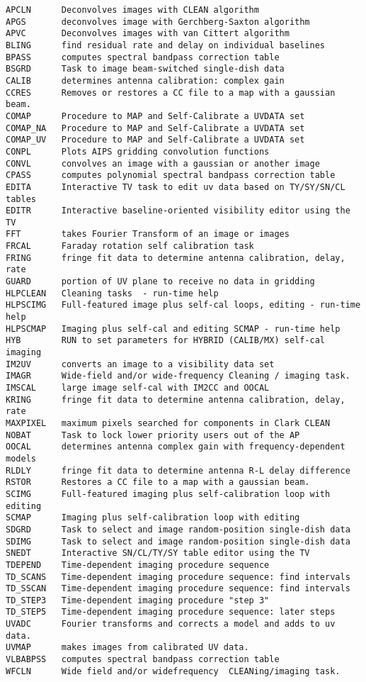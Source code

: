 \vskip 0.5pt
\bbve\begin{verbatim}
APCLN      Deconvolves images with CLEAN algorithm
APGS       deconvolves image with Gerchberg-Saxton algorithm
APVC       Deconvolves images with van Cittert algorithm
BLING      find residual rate and delay on individual baselines
BPASS      computes spectral bandpass correction table
BSGRD      Task to image beam-switched single-dish data
CALIB      determines antenna calibration: complex gain
CCRES      Removes or restores a CC file to a map with a gaussian beam.
COMAP      Procedure to MAP and Self-Calibrate a UVDATA set
COMAP_NA   Procedure to MAP and Self-Calibrate a UVDATA set
COMAP_UV   Procedure to MAP and Self-Calibrate a UVDATA set
CONPL      Plots AIPS gridding convolution functions
CONVL      convolves an image with a gaussian or another image
CPASS      computes polynomial spectral bandpass correction table
EDITA      Interactive TV task to edit uv data based on TY/SY/SN/CL tables
EDITR      Interactive baseline-oriented visibility editor using the TV
FFT        takes Fourier Transform of an image or images
FRCAL      Faraday rotation self calibration task
FRING      fringe fit data to determine antenna calibration, delay, rate
GUARD      portion of UV plane to receive no data in gridding
HLPCLEAN   Cleaning tasks  - run-time help
HLPSCIMG   Full-featured image plus self-cal loops, editing - run-time help
HLPSCMAP   Imaging plus self-cal and editing SCMAP - run-time help
HYB        RUN to set parameters for HYBRID (CALIB/MX) self-cal imaging
IM2UV      converts an image to a visibility data set
IMAGR      Wide-field and/or wide-frequency Cleaning / imaging task.
IMSCAL     large image self-cal with IM2CC and OOCAL
KRING      fringe fit data to determine antenna calibration, delay, rate
MAXPIXEL   maximum pixels searched for components in Clark CLEAN
NOBAT      Task to lock lower priority users out of the AP
OOCAL      determines antenna complex gain with frequency-dependent models
RLDLY      fringe fit data to determine antenna R-L delay difference
RSTOR      Restores a CC file to a map with a gaussian beam.
SCIMG      Full-featured imaging plus self-calibration loop with editing
SCMAP      Imaging plus self-calibration loop with editing
SDGRD      Task to select and image random-position single-dish data
SDIMG      Task to select and image random-position single-dish data
SNEDT      Interactive SN/CL/TY/SY table editor using the TV
TDEPEND    Time-dependent imaging procedure sequence
TD_SCANS   Time-dependent imaging procedure sequence: find intervals
TD_SSCAN   Time-dependent imaging procedure sequence: find intervals
TD_STEP3   Time-dependent imaging procedure "step 3"
TD_STEP5   Time-dependent imaging procedure sequence: later steps
UVADC      Fourier transforms and corrects a model and adds to uv data.
UVMAP      makes images from calibrated UV data.
VLBABPSS   computes spectral bandpass correction table
WFCLN      Wide field and/or widefrequency  CLEANing/imaging task.
\end{verbatim}\eve

